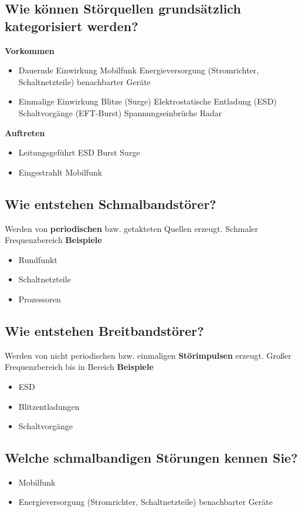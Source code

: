 \subsection{Wie können Störquellen grundsätzlich kategorisiert werden?}
\textbf{Vorkommen}
\begin{itemize}
  \item Dauernde Einwirkung
  \subitem Mobilfunk
  \subitem Energieversorgung (Stromrichter, Schaltnetzteile) benachbarter Geräte
  \item Einmalige Einwirkung
  \subitem Blitze (Surge)
  \subitem Elektrostatische Entladung (ESD)
  \subitem Schaltvorgänge (EFT-Burst)
  \subitem Spannungseinbrüche
  \subitem Radar
\end{itemize}
%
\textbf{Auftreten}
\begin{itemize}
  \item Leitungsgeführt
  \subitem ESD
  \subitem Burst
  \subitem Surge

  \item Eingestrahlt
  \subitem Mobilfunk
\end{itemize}

\subsection{Wie entstehen Schmalbandstörer?}
Werden von \textbf{periodischen} bzw. getakteten Quellen erzeugt. Schmaler Frequenzbereich
\textbf{Beispiele}
\begin{itemize}
  \item Rundfunkt
  \item Schaltnetzteile
  \item Prozessoren
\end{itemize}

\subsection{Wie entstehen Breitbandstörer?}
Werden von nicht periodischen bzw. einmaligen \textbf{Störimpulsen} erzeugt. Großer Frequenzbereich bis in  Bereich
\textbf{Beispiele}
\begin{itemize}
  \item ESD
  \item Blitzentladungen
  \item Schaltvorgänge
\end{itemize}

\subsection{Welche schmalbandigen Störungen kennen Sie?}
\begin{itemize}
  \item Mobilfunk
  \item Energieversorgung (Stromrichter, Schaltnetzteile) benachbarter Geräte
\end{itemize}

